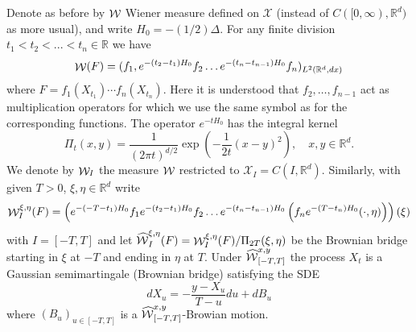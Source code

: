 \documentclass[a4paper,11pt]{article}
\newcommand{\R}{\mathbb{R}}
\newcommand{\W}{\mathop{\mathrm{{\cal W}}}\nolimits}
\newcommand{\WW}{\mathop{\mathrm{\widehat{\cal W}}}\nolimits}
\newcommand{\X}{\mathcal{X}}
\begin{document}
Denote as before by $\W$ Wiener measure defined on $\X$ (instead of 
$C([0,\infty),\R^d)$ as more usual), and write $H_0 = -(1/2)\Delta$. 
For any finite division $t_1 < t_2 < ... < t_n \in \R$  we have
\begin{equation} \label{wiener}
\W(F) = (f_1,e^{-(t_2-t_1)H_0} f_2 \ldots 
e^{-(t_n-t_{n-1})H_0} f_n)_{L^2(\R^d,dx)}
\end{equation}
where $F = f_1(X_{t_1})\cdots f_n(X_{t_n})$. Here it is understood
that $f_2, \ldots, f_{n-1}$ act as multiplication operators for which 
we use the same symbol as for the corresponding functions. The
operator $e^{-tH_0}$ has the integral kernel 
\begin{equation} \label{(2.2)}
\Pi_t(x,y) = \frac{1}{(2 \pi t)^{d/2}} 
\exp \left( - \frac{1}{2t} (x-y)^2 \right), \quad x,y \in \R^d.
\end{equation}
We denote by $\W_I$ the measure $\W$ restricted to $\X_I = C(I,\R^d)$.
Similarly, with given $T>0$, $\xi, \eta \in \R^d$  write 
\begin{equation} \label{(2.3)}
\W^{\xi,\eta}_I(F) = \left( e^{-(-T-t_1)H_0} f_1 e^{-(t_2-t_1)H_0}f_2 
\ldots e^{-(t_n-t_{n-1})H_0} \left( f_n e^{-(T-t_n)H_0}(\cdot,\eta) 
\right) \right) (\xi)
\end{equation}
with $I=[-T,T]$ and let $\WW^{\xi,\eta}_I(F) = \W^{\xi,\eta}_I(F)/ 
\Pi_{2T}(\xi,\eta)$ be the Brownian bridge starting in $\xi$ at $-T$ 
and ending in $\eta$ at $T$. Under $\WW^{x,y}_{[-T,T]}$ the process 
$X_t$ is a Gaussian semimartingale (Brownian bridge) satisfying the SDE
$$
dX_u = - \frac{y-X_u}{T-u} du + dB_u
$$
where $(B_u)_{u\in[-T,T]}$ is a $\WW^{x,y}_{[-T,T]}$-Browian motion. 
\end{document}

